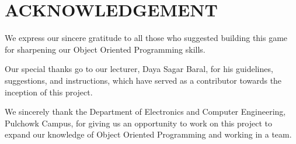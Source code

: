 \newpage
\section*{ACKNOWLEDGEMENT}

We express our sincere gratitude to all those who suggested building this game for sharpening our Object Oriented Programming skills.

\vspace{5mm}
Our special thanks go to our lecturer, Daya Sagar Baral, for his guidelines, suggestions, and instructions, which have served as a contributor towards the inception of this project.

\vspace{5mm}
We sincerely thank the Department of Electronics and Computer Engineering, Pulchowk Campus, for giving us an opportunity to work on this project to expand our knowledge of Object Oriented Programming and working in a team.
